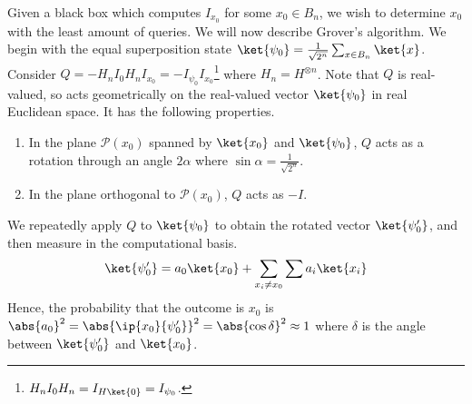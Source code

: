 Given a black box which computes $I_{x_0}$ for some $x_0 \in B_n$, we wish to determine $x_0$ with the least amount of queries.
We will now describe Grover's algorithm.
We begin with the equal superposition state $\ket{\psi_0} = \frac{1}{\sqrt{2^n}} \sum_{x \in B_n} \ket{x}$.
Consider  $Q = -H_n I_0 H_n I_{x_0} = -I_{\psi_0} I_{x_0}$\footnote{$H_n I_0 H_n = I_{H \ket{0}} = I_{\psi_0}$.} where $H_n = H^{\otimes n}$.
Note that $Q$ is real-valued, so acts geometrically on the real-valued vector $\ket{\psi_0}$ in real Euclidean space.
It has the following properties.
\begin{enumerate}
    \item In the plane $\mathcal P(x_0)$ spanned by $\ket{x_0}$ and $\ket{\psi_0}$, $Q$ acts as a rotation through an angle $2\alpha$ where $\sin \alpha = \frac{1}{\sqrt{2^n}}$.
    \item In the plane orthogonal to $\mathcal P(x_0)$, $Q$ acts as $-I$.
\end{enumerate}
We repeatedly apply $Q$ to $\ket{\psi_0}$ to obtain the rotated vector $\ket{\psi_0'}$, and then measure in the computational basis.
\[ \ket{\psi_0'} = a_0 \ket{x_0} + \sum_{x_i \neq x_0} \sum a_i \ket{x_i} \]
Hence, the probability that the outcome is $x_0$ is $\abs{a_0}^2 = \abs{\ip{x_0}{\psi_0'}}^2 = \abs{\cos \delta}^2 \approx 1$ where $\delta$ is the angle between $\ket{\psi_0'}$ and $\ket{x_0}$.

